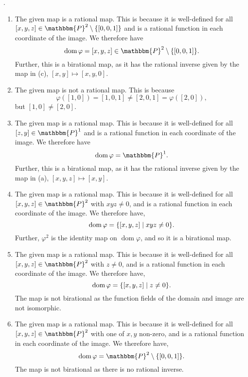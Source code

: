 \documentclass[12pt]{article}
\begin{document}
\sol.
\begin{enumerate}[label = (\alph*)]
    \item The given map is a rational map. This is because it is well-defined for all \( [x,y,z] \in \mathbbm{P}^2 \setminus \qty{[0,0,1]} \) and is a rational function in each coordinate of the image. We therefore have
          \[
              \operatorname{dom} \varphi =[x,y,z] \in \mathbbm{P}^2 \setminus \qty{[0,0,1]}.
          \]
          Further, this is a birational map, as it has the rational inverse given by the map in (c), \( [x,y] \mapsto [x,y,0] \).
          \smallskip
    \item The given map is not a rational map. This is because
          \[
              \varphi([1,0]) = [1,0,1] \neq [2,0,1] = \varphi([2,0]),
          \]
          but \( [1,0] \neq [2,0] \).
          \smallskip

    \item The given map is a rational map. This is because it is well-defined for all \( [z,y] \in \mathbbm{P}^1 \) and is a rational function in each coordinate of the image. We therefore have
          \[
              \operatorname{dom} \varphi = \mathbbm{P}^1.
          \]
          Further, this is a birational map, as it has the rational inverse given by the map in (a), \( [x,y,z] \mapsto [x,y] \).
          \smallskip

    \item The given map is a rational map. This is because it is well-defined for all \( [x,y,z] \in \mathbbm{P}^2 \) with \( xyz \neq 0 \), and is a rational function in each coordinate of the image. We therefore have,
          \[
              \operatorname{dom}  \varphi = \qty{[x,y,z] \mid xyz \neq 0}.
          \]
          Further, \( \varphi^2 \) is the identity map on \( \operatorname{dom} \varphi \), and so it is a birational map.
          \smallskip

    \item The given map is a rational map. This is because it is well-defined for all \( [x,y,z] \in \mathbbm{P}^2 \) with \( z \neq 0 \), and is a rational function in each coordinate of the image. We therefore have,
          \[
              \operatorname{dom} \varphi = \qty{[x,y,z] \mid z \neq 0}.
          \]
          The map is not birational as the function fields of the domain and image are not isomorphic.
          \smallskip

    \item The given map is a rational map. This is because it is well-defined for all \( [x,y,z] \in \mathbbm{P}^2 \) with one of \( x,y \) non-zero, and is a rational function in each coordinate of the image. We therefore have,
          \[
              \operatorname{dom} \varphi = \mathbbm{P}^2 \setminus \qty{[0,0,1]}.
          \]
          The map is not birational as there is no rational inverse.
\end{enumerate}
\end{document}
